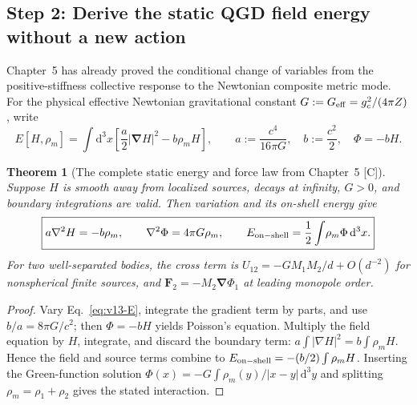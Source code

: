 \documentclass[11pt,a4paper]{article}
\newtheorem{theorem}{Theorem}[section]
\theoremstyle{definition}\newtheorem{definition}[theorem]{Definition}
\theoremstyle{remark}\newtheorem{remark}[theorem]{Remark}
\newcommand{\Ctag}{\textsf{[C]}}
\newcommand{\dd}{\mathrm d}
\begin{document}
\subsection{Step 2: Derive the static QGD field energy without a new action}
\label{sec:v13-fieldenergy}
Chapter~5 has already proved the conditional change of variables from
the positive-stiffness collective response to the Newtonian composite
metric mode.  For the physical effective Newtonian gravitational
constant $G:=G_{\rm eff}=g_c^2/(4\pi Z)$, write
\begin{equation}\label{eq:v13-E}
E[H,\rho_m]=\int\!\dd^3x\left[\frac a2|\bm\nabla H|^2
-b\rho_m H\right],\qquad
 a:=\frac{c^4}{16\pi G},\quad b:=\frac{c^2}{2},\quad
\Phi=-bH.
\end{equation}
\begin{theorem}[The complete static energy and force law from Chapter~5 \Ctag]
\label{thm:v13-energy}
Suppose $H$ is smooth away from localized sources, decays at infinity,
$G>0$, and boundary integrations are valid.  Then variation and its
on-shell energy give
\begin{equation}\label{eq:v13-Eeq}
\boxed{a\nabla^2H=-b\rho_m,
\qquad \nabla^2\Phi=4\pi G\rho_m,
\qquad E_{\rm on-shell}=\frac12\int\!\rho_m\Phi\,\dd^3x.}
\end{equation}
For two well-separated bodies, the cross term is
$U_{12}=-GM_1M_2/d+O(d^{-2})$ for nonspherical finite sources,
and $\bm F_2=-M_2\bm\nabla\Phi_1$ at leading monopole order.
\end{theorem}
\begin{proof}
Vary Eq.~\eqref{eq:v13-E}, integrate the gradient term by parts,
and use $b/a=8\pi G/c^2$; then $\Phi=-bH$ yields Poisson's equation.
Multiply the field equation by $H$, integrate, and discard the boundary
term: $a\int|\nabla H|^2=b\int\rho_mH$. Hence the field and source
terms combine to $E_{\rm on-shell}=-(b/2)\int\rho_mH$.
Inserting the Green-function solution $\Phi(x)=-G\int\rho_m(y)/|x-y|\,\dd^3y$
and splitting $\rho_m=\rho_1+\rho_2$ gives the stated interaction.
\end{proof}
\end{document}
